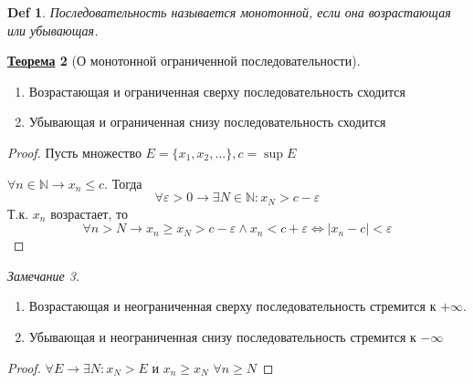 \documentclass[12pt]{article}
\newenvironment{MyList}[1][4pt]{
  \begin{enumerate}[1.]
  \setlength{\parskip}{0pt}
  \setlength{\itemsep}{#1}
}{       
  \end{enumerate}
}
\def\N{\mathbb{N}}       %
\theoremstyle{definition} %
\newtheorem{Thm}{\underline{Теорема}}[subsection] %
\theoremstyle{plain} %
\newtheorem{Def}[Thm]{Def} %
\theoremstyle{remark} %
\newtheorem{Rem}[Thm]{Замечание} %
\begin{document}
\begin{Def}
    Последовательность называется монотонной, если она возрастающая или убывающая.
\end{Def}

\begin{Thm}[О монотонной ограниченной последовательности]
    \begin{MyList}
        \item Возрастающая и ограниченная сверху последовательность сходится
        \item Убывающая и ограниченная снизу последовательность сходится
    \end{MyList}
\end{Thm}

\begin{proof}
    Пусть множество $E = \{x_1, x_2, ...\}, c = \sup E$ 

    $\forall n \in \N \to x_n \leqslant c$. Тогда
    \[\forall \varepsilon > 0 \to \exists N \in \N : x_N > c - \varepsilon\]
    Т.к. $x_n$ возрастает, то \[\forall n > N \to x_n \geqslant x_N > c - \varepsilon \wedge x_n < c + \varepsilon \Leftrightarrow |x_n - c| < \varepsilon\] 
\end{proof}
\begin{Rem}
    \begin{MyList}
        \item Возрастающая и неограниченная сверху последовательность стремится к $+\infty$.
        \item Убывающая и неограниченная снизу последовательность стремится к $-\infty$
    \end{MyList}
    \begin{proof}
        $\forall E \to \exists N : x_N > E$ и $x_n \geqslant x_N$ $\forall n \geqslant N$  
    \end{proof}
\end{Rem}
\end{document}
